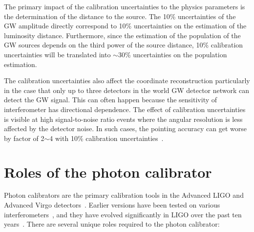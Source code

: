 The primary impact of the calibration uncertainties to the physics parameters 
is the determination of the distance to the source. The 10\% uncertainties of 
the GW amplitude directly correspond to 10\% uncertainties on the estimation 
of the luminosity distance. Furthermore, since the estimation of the 
population of the GW sources depends on the third power of the source 
distance, 10\% calibration uncertainties will be translated into $\sim$30\% 
uncertainties on the population estimation.

The calibration uncertainties also affect the coordinate reconstruction 
particularly in the case that only up to three detectors in the world 
GW detector network can detect the GW signal. This can often happen 
because the sensitivity of interferometer has directional dependence. 
The effect of calibration uncertainties is visible at high signal-to-noise 
ratio events where the angular resolution is less affected by the detector 
noise. In such cases, the pointing accuracy can get worse by factor of 
2$\sim$4 with 10\% calibration uncertainties~\cite{Klimenko}.


\newpage
\section{Roles of the photon calibrator}

Photon calibrators are the primary calibration tools in the Advanced LIGO 
and Advanced Virgo detectors~\cite{LIGO-CAL,Karki,Virgo-PCAL}.
Earlier versions have been tested on various 
interferometers~\cite{Accadia,Clubley:2001,Mossavi:2006},
and they have evolved significantly in LIGO over the past ten 
years~\cite{Goetz:2009}.
There are several unique roles required to the photon calibrator:

